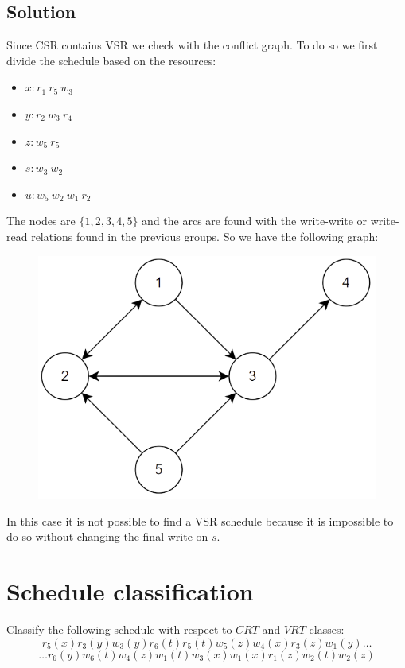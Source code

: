 \documentclass[12pt, a4paper]{report}
\newtheorem[style=M,bodystyle=\normalfont]{theorem}{Theorem}
\newtheorem[style=M,bodystyle=\normalfont]{corollary}{Corollary}
\newtheorem[style=M,bodystyle=\normalfont]{lemma}{Lemma}
\newtheorem[style=M,bodystyle=\normalfont]{definition}{Definition}
\begin{document}
    \subsection*{Solution}
        Since CSR contains VSR we check with the conflict graph. To do so we first divide the schedule based on the resources: 
        \begin{itemize}
            \item $x: r_1 \: r_5 \: w_3$
            \item $y: r_2 \: w_3 \: r_4$
            \item $z: w_5 \: r_5$
            \item $s: w_3 \: w_2$
            \item $u: w_5 \: w_2 \: w_1 \: r_2$
        \end{itemize}
        The nodes are $\{1,2,3,4,5\}$ and the arcs are found with the write-write or write-read relations found in the previous groups. So we have the following graph:
        \begin{figure}[H]
            \centering
            \includegraphics[width=0.5\linewidth]{images/conflictgraph2.png}
        \end{figure}
        In this case it is not possible to find a VSR schedule because it is impossible to do so without changing the final write on $s$. 

    \newpage

    \section{Schedule classification}
        Classify the following schedule with respect to $CRT$ and $VRT$ classes: 
        \[r_5(x) r_3(y) w_3(y) r_6(t) r_5(t) w_5(z) w_4(x) r_3(z) w_1(y) \dots\]
        \[\dots r_6(y) w_6(t) w_4(z) w_1(t) w_3(x) w_1(x) r_1(z) w_2(t) w_2(z)\]
\end{document}
